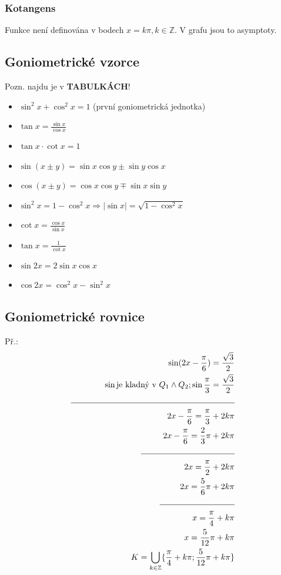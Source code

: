\documentclass[12pt, a4paper]{article}
\newcommand{\imply}{\Rightarrow}
\begin{document}
\subsubsection*{Kotangens}
Funkce není definována v bodech $x=k\pi, k \in \mathbb{Z}$. V grafu jsou to asymptoty.

\subsection*{Goniometrické vzorce}
Pozn. najdu je v \textbf{TABULKÁCH}!\\
\begin{itemize}
\item $\sin^2x + \cos^2x = 1$ (první goniometrická jednotka)
\item $\tan x = \frac{\sin x }{\cos x }$
\item $\tan x \cdot \cot x = 1$
\item $\sin(x \pm y)=\sin x \cos y \pm \sin y \cos x$
\item $\cos(x \pm y)= \cos x \cos y \mp \sin x \sin y$
\item $\sin^2x = 1-\cos^2x \imply |\sin x| = \sqrt{1-\cos^2x}$
\item $\cot x = \frac{\cos x}{\sin x}$
\item $\tan x = \frac{1}{\cot x}$
\item $\sin 2x = 2\sin x \cos x$
\item $\cos 2x = \cos^2x - \sin^2x $
\end{itemize}

\pagebreak

\subsection*{Goniometrické rovnice}
Př.:\\

\begin{align*}
\sin(2x-\frac{\pi}{6})=\frac{\sqrt{3}}{2}\\
\sin \text{je kladný v } Q_1 \land Q_2; \sin \frac{\pi}{3}=\frac{\sqrt{3}}{2}\\
\rule{7cm}{0.4pt}\\
2x-\frac{\pi}{6}=\frac{\pi}{3}+2k\pi \\
2x-\frac{\pi}{6}=\frac{2}{3}\pi+2k\pi \\
\rule{4cm}{0.4pt}\\
2x = \frac{\pi}{2} + 2k\pi\\
2x = \frac{5}{6}\pi + 2k\pi\\
\rule{3.2cm}{0.4pt}\\
x = \frac{\pi}{4}+k\pi\\
x = \frac{5}{12}\pi + k\pi\\
K = \bigcup_{k \in \mathbb{Z}} \{\frac{\pi}{4}+k\pi; \frac{5}{12}\pi + k\pi\}
\end{align*}
\end{document}
